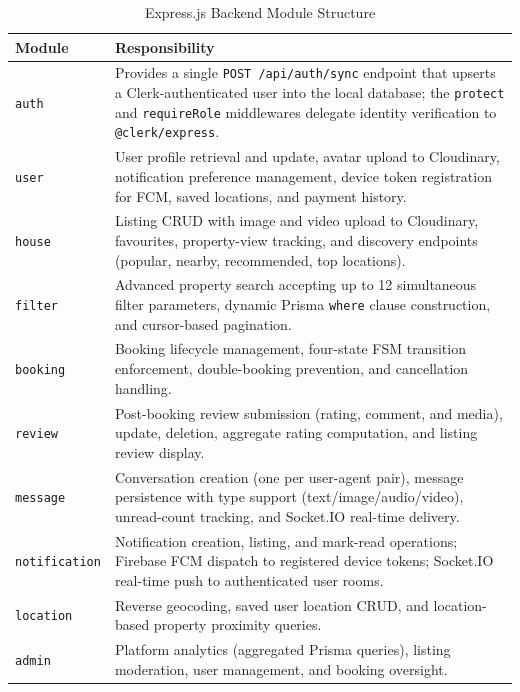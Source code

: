 \documentclass[12pt,a4paper]{report}
\begin{document}
\begin{table}[H]
\caption{Express.js Backend Module Structure}
\label{tab:modules}
\centering
\small
{}
\begin{tabularx}{\textwidth}{|l|X|}
\hline
\textbf{Module} & \textbf{Responsibility} \\
\hline
\texttt{auth} & Provides a single \texttt{POST /api/auth/sync} endpoint that upserts a Clerk-authenticated user into the local database; the \texttt{protect} and \texttt{requireRole} middlewares delegate identity verification to \texttt{@clerk/express}. \\
\hline
\texttt{user} & User profile retrieval and update, avatar upload to Cloudinary, notification preference management, device token registration for FCM, saved locations, and payment history. \\
\hline
\texttt{house} & Listing CRUD with image and video upload to Cloudinary, favourites, property-view tracking, and discovery endpoints (popular, nearby, recommended, top locations). \\
\hline
\texttt{filter} & Advanced property search accepting up to 12 simultaneous filter parameters, dynamic Prisma \texttt{where} clause construction, and cursor-based pagination. \\
\hline
\texttt{booking} & Booking lifecycle management, four-state FSM transition enforcement, double-booking prevention, and cancellation handling. \\
\hline
\texttt{review} & Post-booking review submission (rating, comment, and media), update, deletion, aggregate rating computation, and listing review display. \\
\hline
\texttt{message} & Conversation creation (one per user-agent pair), message persistence with type support (text/image/audio/video), unread-count tracking, and Socket.IO real-time delivery. \\
\hline
\texttt{notification} & Notification creation, listing, and mark-read operations; Firebase FCM dispatch to registered device tokens; Socket.IO real-time push to authenticated user rooms. \\
\hline
\texttt{location} & Reverse geocoding, saved user location CRUD, and location-based property proximity queries. \\
\hline
\texttt{admin} & Platform analytics (aggregated Prisma queries), listing moderation, user management, and booking oversight. \\
\hline
\end{tabularx}
\end{table}
\end{document}
